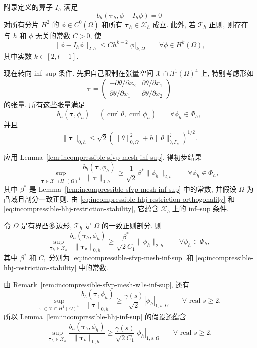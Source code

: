 \begin{Corollary}\label{cor:incompressible-hhj-stream-interpolant}
附录定义的算子 $I_h$ 满足
\[
b_h(\boldsymbol\tau_h,\phi-I_h\phi)=0
\]
对所有分片 $H^2$ 的
$\phi\in C^0(\overline\Omega)$
和所有 $\boldsymbol\tau_h\in\mathcal X_h$ 成立.
此外, 若 $\mathcal T_h$ 正则,
则存在与 $h$ 和 $\phi$ 无关的常数 $C>0$, 使
\[
\|\phi-I_h\phi\|_{2,h}
\leq Ch^{k-2}|\phi|_{k,\Omega}
\qquad\forall\phi\in H^k(\Omega),
\]
其中实数 $k\in[2,l+1]$.
\end{Corollary}

现在转向 inf--sup 条件.
先把自己限制在张量空间
$\mathcal X\cap H^1(\Omega)^4$ 上,
特别考虑形如
\[
\boldsymbol\tau
=\begin{pmatrix}
-\partial\theta/\partial x_2&\partial\theta/\partial x_1\\
\partial\theta/\partial x_1&\partial\theta/\partial x_2
\end{pmatrix}
\]
的张量. 所有这些张量满足
\[
b_h(\boldsymbol\tau,\phi_h)
=(\operatorname{curl}\theta,\operatorname{curl}\phi_h)
\qquad\forall\phi_h\in\Phi_h,
\]
并且
\[
\|\boldsymbol\tau\|_{0,h}
\leq\sqrt2\left(
\|\theta\|_{0,\Omega}^2
+h\|\theta\|_{0,\Gamma_h}^2
\right)^{1/2}.
\]

应用 Lemma~\ref{lem:incompressible-sfvp-mesh-inf-sup}, 得初步结果
\[
\sup_{\boldsymbol\tau\in\mathcal X\cap H^1(\Omega)^4}
\frac{b_h(\boldsymbol\tau,\phi_h)}
{\|\boldsymbol\tau\|_{0,h}}
\geq\frac1{\sqrt2}\beta^*\|\phi_h\|_{2,h}
\qquad\forall\phi_h\in\Phi_h,
\]
其中 $\beta^*$ 是
Lemma~\ref{lem:incompressible-sfvp-mesh-inf-sup} 中的常数,
并假设 $\Omega$ 为凸域且剖分一致正则.
由 \eqref{eq:incompressible-hhj-restriction-orthogonality}
和 \eqref{eq:incompressible-hhj-restriction-stability},
它蕴含 $\mathcal X_h$ 上的 inf--sup 条件.

\begin{Lemma}\label{lem:incompressible-hhj-inf-sup}
令 $\Omega$ 是有界凸多边形,
$\mathcal T_h$ 是 $\Omega$ 的一致正则剖分. 则
\begin{equation}\label{eq:incompressible-hhj-inf-sup}
\sup_{\boldsymbol\tau_h\in\mathcal X_h}
\frac{b_h(\boldsymbol\tau_h,\phi_h)}
{\|\boldsymbol\tau_h\|_{0,h}}
\geq\frac{\beta^*}{\sqrt2C_1}\|\phi_h\|_{2,h}
\qquad\forall\phi_h\in\Phi_h,
\end{equation}
其中 $\beta^*$ 和 $C_1$ 分别为
\eqref{eq:incompressible-sfvp-mesh-inf-sup}
和 \eqref{eq:incompressible-hhj-restriction-stability} 中的常数.
\end{Lemma}

\begin{Remark}\label{rem:incompressible-hhj-w1s-inf-sup}
由 Remark~\ref{rem:incompressible-sfvp-mesh-w1s-inf-sup}, 还有
\[
\sup_{\boldsymbol\tau\in\mathcal X\cap H^1(\Omega)^4}
\frac{b_h(\boldsymbol\tau,\phi_h)}
{\|\boldsymbol\tau\|_{0,h}}
\geq\frac{\gamma(s)}{\sqrt2}|\phi_h|_{1,s,\Omega}
\qquad\forall\text{ real }s\geq2.
\]
所以 Lemma~\ref{lem:incompressible-hhj-inf-sup} 的假设还蕴含
\[
\sup_{\boldsymbol\tau_h\in\mathcal X_h}
\frac{b_h(\boldsymbol\tau_h,\phi_h)}
{\|\boldsymbol\tau_h\|_{0,h}}
\geq\frac{\gamma(s)}{\sqrt2C_1}
|\phi_h|_{1,s,\Omega}
\qquad\forall\text{ real }s\geq2.
\]
\end{Remark}

